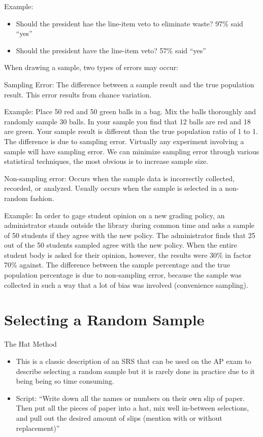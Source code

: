 \documentclass[../stats.tex]{subfiles}
\begin{document}
Example:
\begin{itemize}
    \item Should the president hae the line-item veto to eliminate waste? 97\% said ``yes'' 
    \item Should the president have the line-item veto? 57\% said ``yes''
\end{itemize}

When drawing a sample, two types of errors may occur:

Sampling Error: The difference between a sample result and the true population result. This error results from chance variation.

Example: Place 50 red and 50 green balls in a bag. Mix the balls thoroughly and randomly sample 30 balls. In your sample you find that 12 balls are red and 18 are green. Your sample result is different than the true population ratio of 1 to 1. The difference is due to sampling error.
Virtually any experiment involving a sample will have sampling error. We can minimize sampling error through various statistical techniques, the most obvious is to increase sample size.

Non-sampling error: Occurs when the sample data is incorrectly collected, recorded, or analyzed. Usually occurs when the sample is selected in a non-random fashion.

Example: In order to gage student opinion on a new grading policy, an administrator stands outside the library during common time and asks a sample of 50 students if they agree with the new policy. The administrator finds that 25 out 
of the 50 students sampled agree with the new policy. When the entire student body is asked for their opinion, however, the results were 30\% in factor 70\% against. The difference between the sample percentage and the true population 
percentage is due to non-sampling error, because the sample was collected in such a way that a lot of bias was involved (convenience sampling).


\section{Selecting a Random Sample}
The Hat Method 
\begin{itemize}
    \item This is a classic description of an SRS that can be used on the AP exam to describe selecting a random sample but it is rarely done in practice due to it being being so time consuming.
    \item Script: ``Write down all the names or numbers on their own slip of paper. Then put all the pieces of paper into a hat, mix well in-between selections, and pull out the desired amount of slips (mention with or without replacement)''
\end{itemize}
\end{document}
